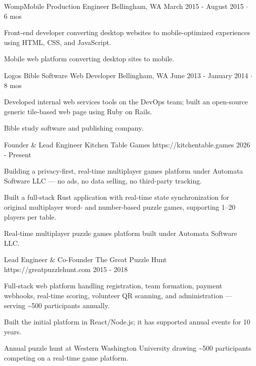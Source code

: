 \documentclass[11pt, a4paper]{awesome-cv}
\begin{document}
\begin{cventries}
  \cventry
    {WompMobile}
    {Production Engineer}
    {Bellingham, WA}
    {March 2015 - August 2015 $\cdot$ 6 mos}
    {
      \begin{cvitems}
        \item Front-end developer converting desktop websites to mobile-optimized experiences using HTML, CSS, and JavaScript.
      \end{cvitems}
    }
    {Mobile web platform converting desktop sites to mobile.}

  \cventry
    {Logos Bible Software}
    {Web Developer}
    {Bellingham, WA}
    {June 2013 - January 2014 $\cdot$ 8 mos}
    {
      \begin{cvitems}
        \item Developed internal web services tools on the DevOps team; built an open-source generic tile-based web page using Ruby on Rails.
      \end{cvitems}
    }
    {Bible study software and publishing company.}

\end{cventries}

\begin{cventries}

  \cventry
    {Founder \& Lead Engineer}
    {Kitchen Table Games}
    {https://kitchentable.games}
    {2026 - Present}
    {
      \begin{cvitems}
        \item Building a privacy-first, real-time multiplayer games platform under Automata Software LLC — no ads, no data selling, no third-party tracking.
        \item Built a full-stack Rust application with real-time state synchronization for original multiplayer word- and number-based puzzle games, supporting 1--20 players per table.
      \end{cvitems}
    }
    {Real-time multiplayer puzzle games platform built under Automata Software LLC.}

  \cventry
    {Lead Engineer \& Co-Founder}
    {The Great Puzzle Hunt}
    {https://greatpuzzlehunt.com}
    {2015 - 2018}
    {
      \begin{cvitems}
        \item Full-stack web platform handling registration, team formation, payment webhooks, real-time scoring, volunteer QR scanning, and administration — serving \textasciitilde500 participants annually.
        \item Built the initial platform in React/Node.js; it has supported annual events for 10 years.
      \end{cvitems}
    }
    {Annual puzzle hunt at Western Washington University drawing \textasciitilde500 participants competing on a real-time game platform.}

\end{cventries}
\end{document}
